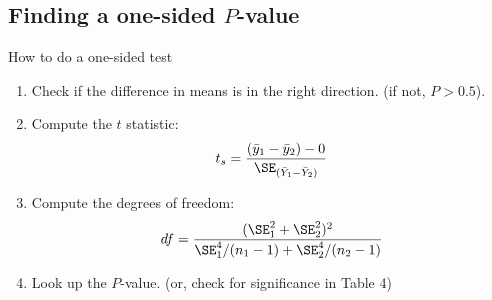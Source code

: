 \subsection{Finding a one-sided $P$-value}

\begin{frame}{How to do a one-sided test}

  \begin{center}
  \end{center}

  \vspace{-1em}

  \begin{enumerate}
    \item Check if the difference in means is in the right direction. (if not, $P>0.5$).

    \item Compute the $t$ statistic:
      \[
          t_s = \frac{ (\bar y_1 - \bar y_2) - 0}{ \SE_{(\bar Y_1 - \bar Y_2)} }
      \]

    \item Compute the degrees of freedom:
        \[
            df = \frac{ (\SE_1^2 + \SE_2^2)^2 }{ \SE_1^4 / (n_1-1) + \SE_2^4 / (n_2 - 1) }
        \]

    \item Look up the $P$-value. (or, check for significance in Table 4)

  \end{enumerate}


\end{frame}

